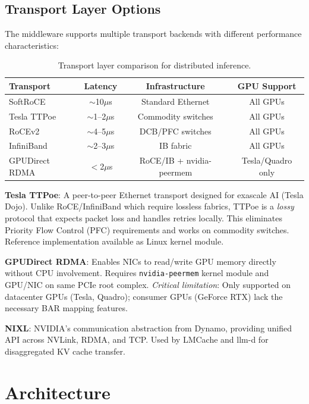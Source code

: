 \documentclass[10pt,letterpaper]{article}
\begin{document}
\subsection{Transport Layer Options}

The middleware supports multiple transport backends with different performance characteristics:

\begin{table}[h]
\centering
\small
\begin{tabular}{@{}lccc@{}}
\toprule
\textbf{Transport} & \textbf{Latency} & \textbf{Infrastructure} & \textbf{GPU Support} \\
\midrule
SoftRoCE & $\sim$10$\mu$s & Standard Ethernet & All GPUs \\
Tesla TTPoe & $\sim$1--2$\mu$s & Commodity switches & All GPUs \\
RoCEv2 & $\sim$4--5$\mu$s & DCB/PFC switches & All GPUs \\
InfiniBand & $\sim$2--3$\mu$s & IB fabric & All GPUs \\
GPUDirect RDMA & $<$2$\mu$s & RoCE/IB + nvidia-peermem & Tesla/Quadro only \\
\bottomrule
\end{tabular}
\caption{Transport layer comparison for distributed inference.}
\end{table}

\textbf{Tesla TTPoe}: A peer-to-peer Ethernet transport designed for exascale AI (Tesla Dojo). Unlike RoCE/InfiniBand which require lossless fabrics, TTPoe is a \textit{lossy} protocol that expects packet loss and handles retries locally. This eliminates Priority Flow Control (PFC) requirements and works on commodity switches. Reference implementation available as Linux kernel module.

\textbf{GPUDirect RDMA}: Enables NICs to read/write GPU memory directly without CPU involvement. Requires \texttt{nvidia-peermem} kernel module and GPU/NIC on same PCIe root complex. \textit{Critical limitation}: Only supported on datacenter GPUs (Tesla, Quadro); consumer GPUs (GeForce RTX) lack the necessary BAR mapping features.

\textbf{NIXL}: NVIDIA's communication abstraction from Dynamo, providing unified API across NVLink, RDMA, and TCP. Used by LMCache and llm-d for disaggregated KV cache transfer.

\section{Architecture}
\end{document}

